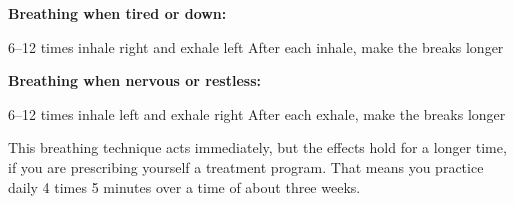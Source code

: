 \documentclass[../main.tex]{subfiles}
\begin{document}
{    \vspace{2mm}
    \noindent \textbf{Breathing when tired or down:}

6--12 times inhale right and exhale left \newline
    After each inhale, make the breaks longer

    \noindent \textbf{Breathing when nervous or restless:}

  6--12 times inhale left and exhale right \newline
  After each exhale, make the breaks longer

      \vspace{2mm}
  This breathing technique acts immediately, but the effects hold for a longer time, if you are prescribing yourself a treatment program.
  That means you practice daily 4 times 5 minutes over a time of about three weeks.
  }
\end{document}
